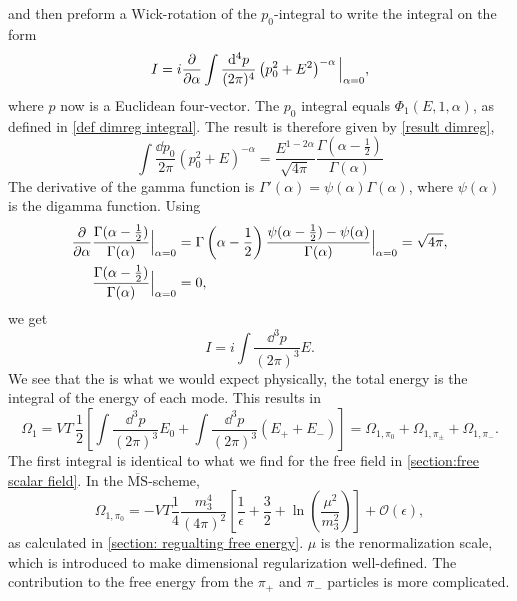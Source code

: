 and then preform a Wick-rotation of the $p_0$-integral to write the integral on the form
\begin{equation}
    I = i \pdv{\alpha} \int \frac{\dd^4 p}{(2 \pi)^4} \left(p_0^2 + E^2\right)^{-\alpha} \Big|_{\alpha=0},
\end{equation}
where $p$ now is a Euclidean four-vector.
The $p_0$ integral equals $\Phi_1(E, 1, \alpha)$, as defined in \autoref{def dimreg integral}. 
The result is therefore given by \autoref{result dimreg},
\begin{equation}
    \int \frac{\dd p_0}{2 \pi} (p_0^2 + E)^{-\alpha} 
    = \frac{E^{1-2\alpha}}{\sqrt{4 \pi}} \frac{\Gamma(\alpha-\frac{1}{2})}{\Gamma(\alpha)}
\end{equation}
The derivative of the gamma function is $\Gamma'(\alpha) = \psi(\alpha)\Gamma(\alpha)$, where $\psi(\alpha)$ is the digamma function.
Using
\begin{align}
    \diffp{}{\alpha} & \frac{\Gamma(\alpha - \frac{1}{2}) }{\Gamma(\alpha)} \Big|_{\alpha=0}
    = \Gamma\left(\alpha - \frac{1}{2}\right) \frac{\psi(\alpha - \frac{1}{2}) - \psi(\alpha)}{\Gamma(\alpha)} \Big|_{\alpha=0}
    = \sqrt{4 \pi}, \\
    & \frac{\Gamma(\alpha - \frac{1}{2}) }{\Gamma(\alpha)}\Big|_{\alpha=0} = 0,
\end{align}
we get
\begin{equation}
    I = i \int \frac{\dd^3 p}{(2 \pi)^3} E.
\end{equation}
We see that the is what we would expect physically, the total energy is the integral of the energy of each mode.
This results in 
\begin{equation}
    \Omega_1 = 
    V T \, \frac{1}{2} 
    \left[\int \frac{\dd^3 p}{(2\pi)^3} E_0 + \int  \frac{\dd^3 p}{(2\pi)^3} (E_+ + E_-)\right]
    = \Omega_{1, \pi_0} + \Omega_{1, \pi_\pm} + \Omega_{1, \pi_-}.
\end{equation}
The first integral is identical to what we find for the free field in \autoref{section:free scalar field}.
In the $\overline{\mathrm{MS}}$-scheme,
\begin{equation}
    \Omega_{1, \pi_0} 
    = 
    - VT \frac{1}{4} \frac{m_3^4}{(4\pi)^2} 
    \left[ \frac{1}{\epsilon} + \frac{3}{2} + \ln(\frac{\mu^2}{m_3^2}) \right] + \mathcal{O}(\epsilon),
\end{equation}
as calculated in \autoref{section: regualting free energy}.
$\mu$ is the renormalization scale, which is introduced to make dimensional regularization well-defined.
The contribution to the free energy from the $\pi_+$ and $\pi_-$ particles is more complicated.
